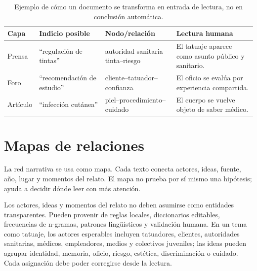 \documentclass[11pt]{article}
\begin{document}
\begin{table}[H]
\centering
\small
\begin{tabular}{L{0.17\textwidth}L{0.24\textwidth}L{0.23\textwidth}L{0.24\textwidth}}
\toprule
\textbf{Capa} & \textbf{Indicio posible} & \textbf{Nodo/relación} & \textbf{Lectura humana} \\
\midrule
Prensa & ``regulación de tintas'' & autoridad sanitaria--tinta--riesgo & El tatuaje aparece como asunto público y sanitario. \\
Foro & ``recomendación de estudio'' & cliente--tatuador--confianza & El oficio se evalúa por experiencia compartida. \\
Artículo & ``infección cutánea'' & piel--procedimiento--cuidado & El cuerpo se vuelve objeto de saber médico. \\
\bottomrule
\end{tabular}
\caption{Ejemplo de cómo un documento se transforma en entrada de lectura, no en conclusión automática.}
\label{tab:microcaso-es}
\end{table}

\section{Mapas de relaciones}

La red narrativa se usa como mapa. Cada texto conecta actores, ideas, fuente,
año, lugar y momentos del relato. El mapa no prueba por sí mismo una hipótesis;
ayuda a decidir dónde leer con más atención.

Los actores, ideas y momentos del relato no deben asumirse como entidades
transparentes. Pueden provenir de reglas locales, diccionarios editables,
frecuencias de n-gramas, patrones lingüísticos y validación humana. En un tema
como tatuaje, los actores esperables incluyen tatuadores, clientes, autoridades
sanitarias, médicos, empleadores, medios y colectivos juveniles; las ideas pueden
agrupar identidad, memoria, oficio, riesgo, estética, discriminación o cuidado.
Cada asignación debe poder corregirse desde la lectura.
\end{document}
